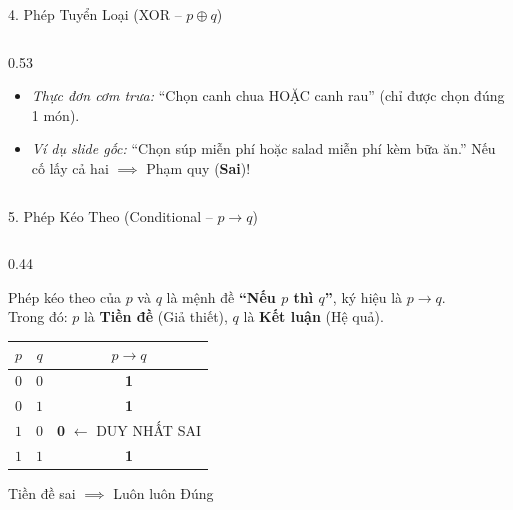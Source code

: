 \documentclass[aspectratio=169, 10pt]{beamer}
\begin{document}
\begin{frame}{4. Phép Tuyển Loại (XOR -- $p \oplus q$)}
\begin{columns}[t, onlytextwidth]
\begin{column}{0.53\textwidth}
\begin{cozyTrap}
\begin{itemize}
          \begin{itemize}
            \setlength{\itemsep}{2pt}
            \item \textit{Thực đơn cơm trưa:} ``Chọn canh chua HOẶC canh rau'' (chỉ được chọn đúng 1 món).
            \item \textit{Ví dụ slide gốc:} ``Chọn súp miễn phí hoặc salad miễn phí kèm bữa ăn.'' Nếu cố lấy cả hai $\implies$ Phạm quy (\textbf{\textcolor{cozyFalse}{Sai}})!
          \end{itemize}
        \end{itemize}
      \end{cozyTrap}
    \end{column}
  \end{columns}
\end{frame}

\begin{frame}{5. Phép Kéo Theo (Conditional -- $p \to q$)}
  \begin{columns}[t, onlytextwidth]
    \begin{column}{0.44\textwidth}
      \begin{cozyDef}
        \small
        Phép kéo theo của $p$ và $q$ là mệnh đề \textbf{``Nếu $p$ thì $q$''}, ký hiệu là $p \to q$.\\
        \vspace{0.05cm}
        Trong đó: $p$ là \textbf{Tiền đề} (Giả thiết), $q$ là \textbf{Kết luận} (Hệ quả).
        \vspace{0.15cm}
        \begin{center}
          \renewcommand{\arraystretch}{1.1}
          \begin{tabular}{cc|c}
            \toprule
            $p$ & $q$ & $p \to q$ \\
            \midrule
            $0$ & $0$ & \textbf{\textcolor{cozyTrue}{1}} \\
            $0$ & $1$ & \textbf{\textcolor{cozyTrue}{1}} \\
            $1$ & $0$ & \textbf{\textcolor{cozyFalse}{0}} \;\textcolor{cozyFalse}{$\leftarrow$ DUY NHẤT SAI} \\
            $1$ & $1$ & \textbf{\textcolor{cozyTrue}{1}} \\
            \bottomrule
          \end{tabular}
        \end{center}
        \vspace{0.05cm}
        \par\footnotesize\centering\color{cozyMuted}Tiền đề sai $\implies$ Luôn luôn Đúng

\end{cozyDef}
\end{column}
\end{columns}
\end{frame}
\end{document}
